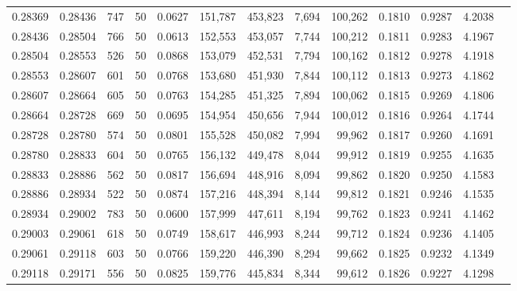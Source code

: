 \begin{tabular}{rrrrrrrrrrrrr}
0.28369 & 0.28436 &   747 &  50 &                                     0.0627 & 151,787 & 453,823 &   7,694 & 100,262 & 0.1810 & 0.9287 & 4.2038 \\
0.28436 & 0.28504 &   766 &  50 &                                     0.0613 & 152,553 & 453,057 &   7,744 & 100,212 & 0.1811 & 0.9283 & 4.1967 \\
0.28504 & 0.28553 &   526 &  50 &                                     0.0868 & 153,079 & 452,531 &   7,794 & 100,162 & 0.1812 & 0.9278 & 4.1918 \\
0.28553 & 0.28607 &   601 &  50 &                                     0.0768 & 153,680 & 451,930 &   7,844 & 100,112 & 0.1813 & 0.9273 & 4.1862 \\
0.28607 & 0.28664 &   605 &  50 &                                     0.0763 & 154,285 & 451,325 &   7,894 & 100,062 & 0.1815 & 0.9269 & 4.1806 \\
0.28664 & 0.28728 &   669 &  50 &                                     0.0695 & 154,954 & 450,656 &   7,944 & 100,012 & 0.1816 & 0.9264 & 4.1744 \\
0.28728 & 0.28780 &   574 &  50 &                                     0.0801 & 155,528 & 450,082 &   7,994 &  99,962 & 0.1817 & 0.9260 & 4.1691 \\
0.28780 & 0.28833 &   604 &  50 &                                     0.0765 & 156,132 & 449,478 &   8,044 &  99,912 & 0.1819 & 0.9255 & 4.1635 \\
0.28833 & 0.28886 &   562 &  50 &                                     0.0817 & 156,694 & 448,916 &   8,094 &  99,862 & 0.1820 & 0.9250 & 4.1583 \\
0.28886 & 0.28934 &   522 &  50 &                                     0.0874 & 157,216 & 448,394 &   8,144 &  99,812 & 0.1821 & 0.9246 & 4.1535 \\
0.28934 & 0.29002 &   783 &  50 &                                     0.0600 & 157,999 & 447,611 &   8,194 &  99,762 & 0.1823 & 0.9241 & 4.1462 \\
0.29003 & 0.29061 &   618 &  50 &                                     0.0749 & 158,617 & 446,993 &   8,244 &  99,712 & 0.1824 & 0.9236 & 4.1405 \\
0.29061 & 0.29118 &   603 &  50 &                                     0.0766 & 159,220 & 446,390 &   8,294 &  99,662 & 0.1825 & 0.9232 & 4.1349 \\
0.29118 & 0.29171 &   556 &  50 &                                     0.0825 & 159,776 & 445,834 &   8,344 &  99,612 & 0.1826 & 0.9227 & 4.1298 \\

\end{tabular}
